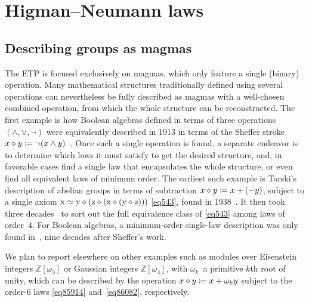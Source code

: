 \section{Higman--Neumann laws}\label{higman-neumann}

\subsection{Describing groups as magmas}

The ETP is focused exclusively on magmas, which only feature a single (binary) operation.  Many mathematical structures traditionally defined using several operations can nevertheless be fully described as magmas with a well-chosen combined operation, from which the whole structure can be reconstructed.  The first example is how Boolean algebras defined in terms of three operations $(\land,\lor,\lnot)$ were equivalently described in 1913 in terms of the Sheffer stroke $x\diamond y\coloneqq \lnot(x\land y)$~\cite{sheffer}.  Once such a single operation is found, a separate endeavor is to determine which laws it must satisfy to get the desired structure, and, in favorable cases find a single law that encapsulates the whole structure, or even find all equivalent laws of minimum order.  The earliest such example is Tarski's description of abelian groups in terms of subtraction $x\diamond y\coloneqq x+(-y)$, subject to a single axiom $\mathrm{x} \simeq \mathrm{y} \diamond (\mathrm{z} \diamond (\mathrm{x} \diamond (\mathrm{y} \diamond \mathrm{z})))$ \eqref{eq543}, found in 1938~\cite{Tarski1938}.  It then took three decades~\cite{higman-neumann,Sholander01021959,Padmanabhan_1969} to sort out the full equivalence class of \eqref{eq543} among laws of order~$4$.  For Boolean algebras, a minimum-order single-law description was only found in~\cite{mccune_et_al}, nine decades after Sheffer's work.

We plan to report elsewhere on other examples such as modules over Eisenstein integers $\mathbb{Z}[\omega_3]$ or Gaussian integers $\mathbb{Z}[\omega_4]$, with $\omega_k$~a primitive $k$th root of unity, which can be described by the operation $x \diamond y \coloneqq x + \omega_k y$ subject to the order-$6$ laws \eqref{eq85914} and~\eqref{eq86082}, respectively.


